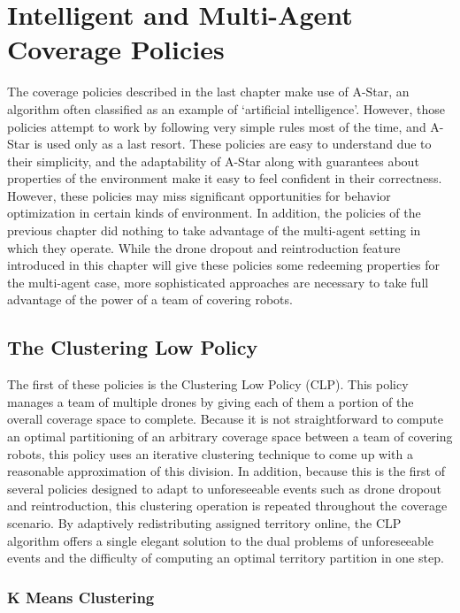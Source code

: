 \chapter{Intelligent and Multi-Agent Coverage Policies}

The coverage policies described in the last chapter make use of A-Star, an algorithm often classified as an example of `artificial intelligence'. However, those policies attempt to work by following very simple rules most of the time, and A-Star is used only as a last resort. These policies are easy to understand due to their simplicity, and the adaptability of A-Star along with guarantees about properties of the environment make it easy to feel confident in their correctness. However, these policies may miss significant opportunities for behavior optimization in certain kinds of environment. In addition, the policies of the previous chapter did nothing to take advantage of the multi-agent setting in which they operate. While the drone dropout and reintroduction feature introduced in this chapter will give these policies some redeeming properties for the multi-agent case, more sophisticated approaches are necessary to take full advantage of the power of a team of covering robots.

\section{The Clustering Low Policy}

The first of these policies is the Clustering Low Policy (CLP). This policy manages a team of multiple drones by giving each of them a portion of the overall coverage space to complete. Because it is not straightforward to compute an optimal partitioning of an arbitrary coverage space between a team of covering robots, this policy uses an iterative clustering technique to come up with a reasonable approximation of this division. In addition, because this is the first of several policies designed to adapt to unforeseeable events such as drone dropout and reintroduction, this clustering operation is repeated throughout the coverage scenario. By adaptively redistributing assigned territory online, the CLP algorithm offers a single elegant solution to the dual problems of unforeseeable events and the difficulty of computing an optimal territory partition in one step.

\subsection{K Means Clustering}

